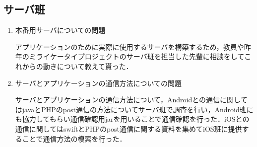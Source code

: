 \subsection{サーバ班}
\begin{enumerate}
\item 本番用サーバについての問題
\par
アプリケーションのために実際に使用するサーバを構築するため，教員や昨年のミライケータイプロジェクトのサーバ班を担当した先輩に相談をしてこれからの動きについて教えて貰った．
\item サーバとアプリケーションの通信方法についての問題
\par
サーバとアプリケーションの通信方法について，Androidとの通信に関してはjavaとPHPのpost通信の方法についてサーバ班で調査を行い，Android班にも協力してもらい通信確認用jarを用いることで通信確認を行った．iOSとの通信に関してはswiftとPHPのpost通信に関する資料を集めてiOS班に提供することで通信方法の模索を行った．
\end{enumerate}
